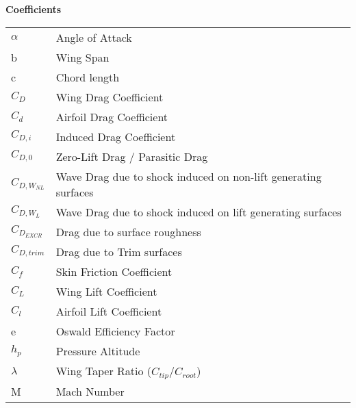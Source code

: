 \hspace{-0.5in}\textbf{Coefficients}
{\renewcommand\arraystretch{1.0}
\noindent\begin{longtable*}{@{}l @{\quad=\quad} l@{}}
    $\alpha$ & Angle of Attack \\
    b & Wing Span \\
    c & Chord length \\
    $C_D$ & Wing Drag Coefficient \\
    $C_d$ & Airfoil Drag Coefficient \\
    $C_{D,i}$ & Induced Drag Coefficient \\ %
    $C_{D,0}$ & Zero-Lift Drag / Parasitic Drag \\
    $C_{D,W_{NL}}$ & Wave Drag due to shock induced on non-lift generating surfaces \\
    $C_{D,W_{L}}$ & Wave Drag due to shock induced on lift generating surfaces \\
    $C_{D_{EXCR}}$ & Drag due to surface roughness \\
    $C_{D,trim}$ & Drag due to Trim surfaces \\
    $C_f$ & Skin Friction Coefficient \\
    $C_L$ & Wing Lift Coefficient \\ %
    $C_l$ & Airfoil Lift Coefficient \\
    e & Oswald Efficiency Factor \\
    $h_p$ & Pressure Altitude \\
    $\lambda$ & Wing Taper Ratio ($C_{tip} / C_{root}$) \\
    M & Mach Number \\

\end{longtable*}}
